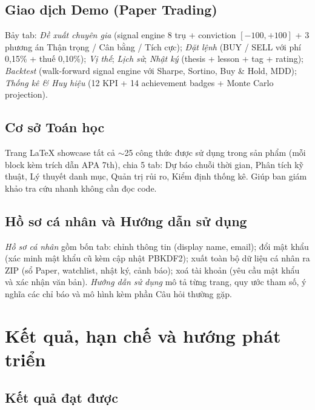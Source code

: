 \documentclass[12pt,a4paper,openany,oneside]{report}
\numberwithin{equation}{chapter}
\begin{document}
\section{Giao dịch Demo (Paper Trading)}

\indent Bảy tab: \emph{Đề xuất chuyên gia} (signal engine 8 trụ +
conviction $[-100, +100]$ + 3 phương án Thận trọng / Cân bằng / Tích
cực); \emph{Đặt lệnh} (BUY / SELL với phí 0{,}15\% + thuế 0{,}10\%);
\emph{Vị thế}; \emph{Lịch sử}; \emph{Nhật ký} (thesis + lesson + tag +
rating); \emph{Backtest} (walk-forward signal engine với Sharpe, Sortino,
Buy \& Hold, MDD); \emph{Thống kê \& Huy hiệu} (12 KPI + 14 achievement
badges + Monte Carlo projection).

\section{Cơ sở Toán học}

\indent Trang \LaTeX{} showcase tất cả $\sim$25 công thức được sử dụng
trong sản phẩm (mỗi block kèm trích dẫn APA 7th), chia 5 tab: Dự báo
chuỗi thời gian, Phân tích kỹ thuật, Lý thuyết danh mục, Quản trị rủi ro,
Kiểm định thống kê. Giúp ban giám khảo tra cứu nhanh không cần đọc code.

\section{Hồ sơ cá nhân và Hướng dẫn sử dụng}

\indent \emph{Hồ sơ cá nhân} gồm bốn tab: chỉnh thông tin (display
name, email); đổi mật khẩu (xác minh mật khẩu cũ kèm cập nhật
PBKDF2); xuất toàn bộ dữ liệu cá nhân ra ZIP (sổ Paper, watchlist,
nhật ký, cảnh báo); xoá tài khoản (yêu cầu mật khẩu và xác nhận văn
bản). \emph{Hướng dẫn sử dụng} mô tả từng trang, quy ước tham số, ý
nghĩa các chỉ báo và mô hình kèm phần Câu hỏi thường gặp.

\chapter{Kết quả, hạn chế và hướng phát triển}

\section{Kết quả đạt được}
\end{document}
